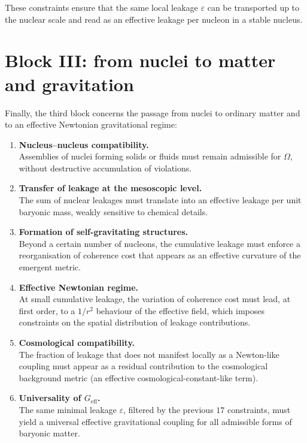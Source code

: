 \documentclass[11pt,a4paper]{article}
\begin{document}
These constraints ensure that the same local leakage $\varepsilon$ can be
transported up to the nuclear scale and read as an effective leakage per
nucleon in a stable nucleus.

\section{Block III: from nuclei to matter and gravitation}
\label{sec:blockIII}

Finally, the third block concerns the passage from nuclei to ordinary matter
and to an effective Newtonian gravitational regime:

\begin{enumerate}
  \item \textbf{Nucleus--nucleus compatibility.} \\
  Assemblies of nuclei forming solids or fluids must remain admissible for
  $\Omega$, without destructive accumulation of violations.

  \item \textbf{Transfer of leakage at the mesoscopic level.} \\
  The sum of nuclear leakages must translate into an effective leakage per
  unit baryonic mass, weakly sensitive to chemical details.

  \item \textbf{Formation of self-gravitating structures.} \\
  Beyond a certain number of nucleons, the cumulative leakage must enforce
  a reorganisation of coherence cost that appears as an effective curvature
  of the emergent metric.

  \item \textbf{Effective Newtonian regime.} \\
  At small cumulative leakage, the variation of coherence cost must lead,
  at first order, to a $1/r^2$ behaviour of the effective field, which imposes
  constraints on the spatial distribution of leakage contributions.

  \item \textbf{Cosmological compatibility.} \\
  The fraction of leakage that does not manifest locally as a Newton-like
  coupling must appear as a residual contribution to the cosmological
  background metric (an effective cosmological-constant-like term).

  \item \textbf{Universality of $G_{\text{eff}}$.} \\
  The same minimal leakage $\varepsilon$, filtered by the previous $17$
  constraints, must yield a universal effective gravitational coupling for
  all admissible forms of baryonic matter.
\end{enumerate}
\end{document}

